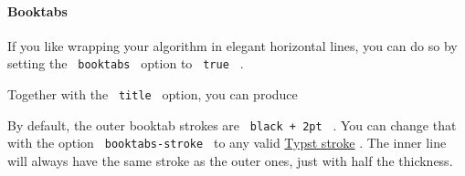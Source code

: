 \pandocbounded{}

\paragraph{Booktabs}\label{booktabs}

If you like wrapping your algorithm in elegant horizontal lines, you can
do so by setting the \texttt{\ booktabs\ } option to \texttt{\ true\ } .

\begin{Shaded}
\begin{Highlighting}[]
\NormalTok{\#pseudocode{-}list(booktabs: true)[}
\NormalTok{]}
\end{Highlighting}
\end{Shaded}

\pandocbounded{}

Together with the \texttt{\ title\ } option, you can produce

\begin{Shaded}
\begin{Highlighting}[]
\NormalTok{\#pseudocode{-}list(booktabs: true, title: [My cool title])[}
\NormalTok{]}
\end{Highlighting}
\end{Shaded}

\pandocbounded{}

By default, the outer booktab strokes are \texttt{\ black\ +\ 2pt\ } .
You can change that with the option \texttt{\ booktabs-stroke\ } to any
valid \href{https://typst.app/docs/reference/visualize/stroke/}{Typst
stroke} . The inner line will always have the same stroke as the outer
ones, just with half the thickness.

